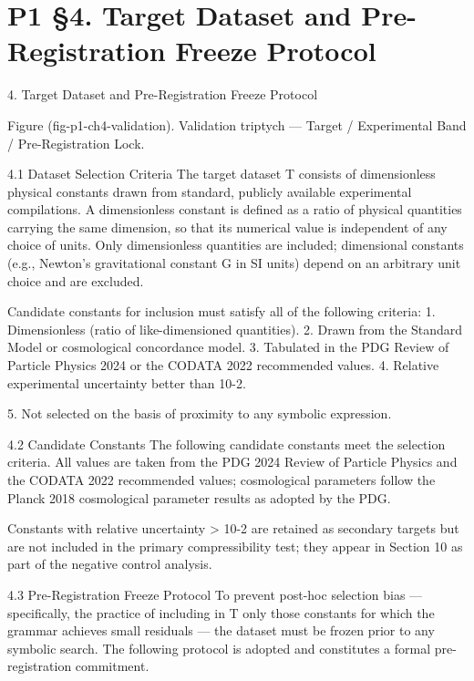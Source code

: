 
\section{P1 §4. Target Dataset and Pre-Registration Freeze Protocol}

4. Target Dataset and Pre-Registration Freeze Protocol

                   Figure (fig-p1-ch4-validation). Validation triptych --- Target / Experimental Band /
                                                 Pre-Registration Lock.

  4.1 Dataset Selection Criteria
  The target dataset T consists of dimensionless physical constants drawn from standard,
  publicly available experimental compilations. A dimensionless constant is defined as a
  ratio of physical quantities carrying the same dimension, so that its numerical value is
  independent of any choice of units. Only dimensionless quantities are included;
  dimensional constants (e.g., Newton's gravitational constant G in SI units) depend on
  an arbitrary unit choice and are excluded.

  Candidate constants for inclusion must satisfy all of the following criteria:
  1. Dimensionless (ratio of like-dimensioned quantities).
  2. Drawn from the Standard Model or cosmological concordance model.
  3. Tabulated in the PDG Review of Particle Physics 2024 or the CODATA 2022
  recommended values.
  4. Relative experimental uncertainty better than 10-2.

  5. Not selected on the basis of proximity to any symbolic expression.

  4.2 Candidate Constants
  The following candidate constants meet the selection criteria. All values are taken from
  the PDG 2024 Review of Particle Physics and the CODATA 2022 recommended values;
  cosmological parameters follow the Planck 2018 cosmological parameter results as
  adopted by the PDG.

  Constants with relative uncertainty > 10-2 are retained as secondary targets but are
  not included in the primary compressibility test; they appear in Section 10 as part of
  the negative control analysis.

  4.3 Pre-Registration Freeze Protocol
  To prevent post-hoc selection bias --- specifically, the practice of including in T only
  those constants for which the grammar achieves small residuals --- the dataset must be
  frozen prior to any symbolic search. The following protocol is adopted and constitutes a
  formal pre-registration commitment.

